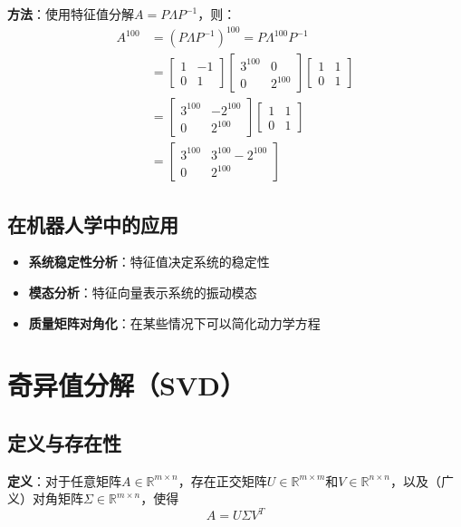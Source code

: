 \documentclass[12pt,a4paper]{article}
\begin{document}
\textbf{方法}：使用特征值分解$A = P\Lambda P^{-1}$，则：
\begin{align}
A^{100} &= (P\Lambda P^{-1})^{100} = P\Lambda^{100} P^{-1} \\
&= \begin{bmatrix} 1 & -1 \\ 0 & 1 \end{bmatrix} \begin{bmatrix} 3^{100} & 0 \\ 0 & 2^{100} \end{bmatrix} \begin{bmatrix} 1 & 1 \\ 0 & 1 \end{bmatrix} \\
&= \begin{bmatrix} 3^{100} & -2^{100} \\ 0 & 2^{100} \end{bmatrix} \begin{bmatrix} 1 & 1 \\ 0 & 1 \end{bmatrix} \\
&= \begin{bmatrix} 3^{100} & 3^{100} - 2^{100} \\ 0 & 2^{100} \end{bmatrix}
\end{align}

\subsection{在机器人学中的应用}

\begin{itemize}
\item \textbf{系统稳定性分析}：特征值决定系统的稳定性
\item \textbf{模态分析}：特征向量表示系统的振动模态
\item \textbf{质量矩阵对角化}：在某些情况下可以简化动力学方程
\end{itemize}

\section{奇异值分解（SVD）}

\subsection{定义与存在性}

\textbf{定义}：对于任意矩阵$A \in \mathbb{R}^{m \times n}$，存在正交矩阵$U \in \mathbb{R}^{m \times m}$和$V \in \mathbb{R}^{n \times n}$，以及（广义）对角矩阵$\Sigma \in \mathbb{R}^{m \times n}$，使得
\begin{equation}
A = U \Sigma V^T
\label{eq:svd_decomp}
\end{equation}
\end{document}
